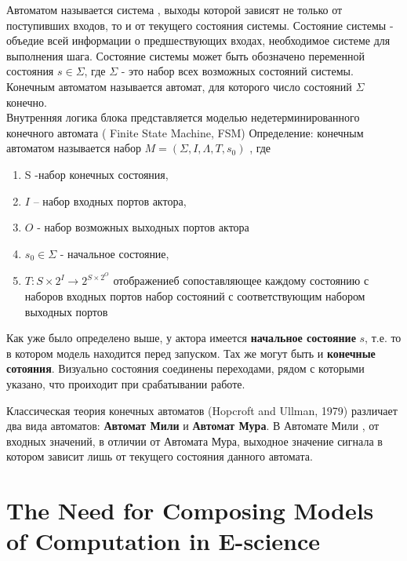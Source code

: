 \documentclass[a4paper,14pt]{article}
\newenvironment{definition}[1]{\begin{trivlist}
\item[\hskip \labelsep {\bfseries #1}]}{\end{trivlist}}
\begin{document}
\begin{definition}{Finite State Machines}
Автоматом называется система , выходы которой зависят не только от поступивших входов, то и от текущего состояния системы. Состояние системы - объедие всей информации о предшествующих входах, необходимое системе для выполнения шага. Состояние системы может быть обозначено переменной состояния $s \in \Sigma$, где $\Sigma$  - это набор всех возможных состояний системы. Конечным автоматом называется автомат, для которого число состояний $\Sigma$ конечно.
\\
Внутренняя логика блока представляется моделью недетерминированного конечного автомата ( Finite State Machine, FSM)
Определение: конечным автоматом называется набор $ M = (\Sigma, I,\Lambda, T, s_{0})$ , где
\begin{enumerate}
\item[-] S -набор конечных состояния,
\item[-] $I$ – набор входных портов актора,
\item[-] $O$ - набор возможных выходных портов актора
\item[-] $s_{0} \in \Sigma$ - начальное состояние,
\item[-] $T: S \times 2^{I} \rightarrow  2^{S \times 2^{O}}$ отображениеб сопоставляющее каждому состоянию с наборов входных портов набор состояний с соответствующим набором выходных портов
\end{enumerate}


Как уже было определено выше, у актора имеется \textbf{начальное состояние} $s$, т.е. то в котором модель находится перед запуском. Тах же могут быть и \textbf{конечные сотояния}. Визуально состояния соединены переходами, рядом с которыми указано, что проиходит при срабатывании работе.


Классическая теория конечных автоматов  (Hopcroft and Ullman, 1979) различает два вида автоматов: \textbf{Автомат Мили} и \textbf{Автомат Мура}. В Автомате Мили , от входных значений, в отличии от Автомата Мура, выходное значение сигнала в котором зависит лишь от текущего состояния данного автомата.


\end{definition}




\section{The Need for Composing Models of Computation in E-science}
\end{document}
